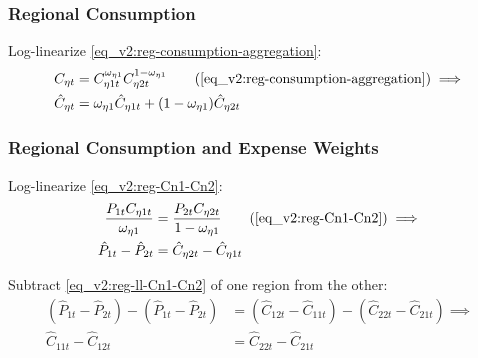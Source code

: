 \documentclass[../thesis.tex]{subfiles}
\begin{document}
\begin{tcolorbox}[colback=red!5!white,colframe=red!75!black]

\subsubsection*{Regional Consumption}
	
	Log-linearize \ref{eq_v2:reg-consumption-aggregation}:
	\begin{align}
		C_{\eta t} &= C_{\eta 1 t}^{\omega_{\eta 1}} C_{\eta 2 t}^{1-\omega_{\eta 1}} \tag{\ref{eq_v2:reg-consumption-aggregation}} \implies \\
		\hat{C}_{\eta t} &= \omega_{\eta 1} \hat{C}_{\eta 1 t} + (1-\omega_{\eta 1}) \hat{C}_{\eta 2 t} \label{eq_v2:reg-ll-consumption-aggregation}
	\end{align}
	
\subsubsection*{Regional Consumption and Expense Weights}
	
	Log-linearize \ref{eq_v2:reg-Cn1-Cn2}:
	\begin{align}
		\frac{P_{1 t} C_{\eta 1 t}}{\omega_{\eta 1}} &= \frac{P_{2 t} C_{\eta 2 t}}{1 -\omega_{\eta 1}} \tag{\ref{eq_v2:reg-Cn1-Cn2}} \implies \\
		\hat{P}_{1 t} - \hat{P}_{2 t} &= \hat{C}_{\eta 2 t} - \hat{C}_{\eta 1 t} \label{eq_v2:reg-ll-Cn1-Cn2}
	\end{align}
	
	Subtract \ref{eq_v2:reg-ll-Cn1-Cn2} of one region from the other:
	\begin{align}
		(\hat{P}_{1 t} - \hat{P}_{2 t}) - (\hat{P}_{1 t} - \hat{P}_{2 t}) &= (\hat{C}_{12t} - \hat{C}_{11t}) - (\hat{C}_{22t} - \hat{C}_{21t}) \implies \nonumber \\
		\hat{C}_{11t} - \hat{C}_{12t} &= \hat{C}_{22t} - \hat{C}_{21t} \label{eq_v2:reg-ll-Cn1-Cn2-b}
	\end{align}
	
\end{tcolorbox}
\end{document}

